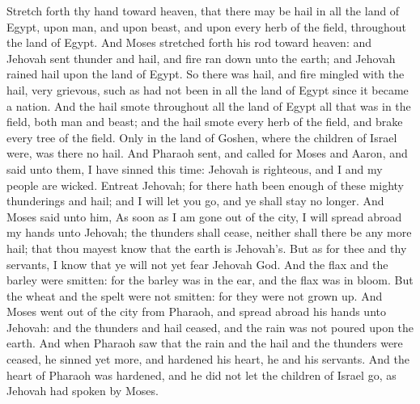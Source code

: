 Stretch forth thy hand toward heaven, that there may be hail in all the land of Egypt, upon man, and upon beast, and upon every herb of the field, throughout the land of Egypt. And Moses stretched forth his rod toward heaven: and Jehovah sent thunder and hail, and fire ran down unto the earth; and Jehovah rained hail upon the land of Egypt. So there was hail, and fire mingled with the hail, very grievous, such as had not been in all the land of Egypt since it became a nation. And the hail smote throughout all the land of Egypt all that was in the field, both man and beast; and the hail smote every herb of the field, and brake every tree of the field. Only in the land of Goshen, where the children of Israel were, was there no hail.  And Pharaoh sent, and called for Moses and Aaron, and said unto them, I have sinned this time: Jehovah is righteous, and I and my people are wicked. Entreat Jehovah; for there hath been enough of these mighty thunderings and hail; and I will let you go, and ye shall stay no longer. And Moses said unto him, As soon as I am gone out of the city, I will spread abroad my hands unto Jehovah; the thunders shall cease, neither shall there be any more hail; that thou mayest know that the earth is Jehovah’s. But as for thee and thy servants, I know that ye will not yet fear Jehovah God. And the flax and the barley were smitten: for the barley was in the ear, and the flax was in bloom. But the wheat and the spelt were not smitten: for they were not grown up. And Moses went out of the city from Pharaoh, and spread abroad his hands unto Jehovah: and the thunders and hail ceased, and the rain was not poured upon the earth. And when Pharaoh saw that the rain and the hail and the thunders were ceased, he sinned yet more, and hardened his heart, he and his servants. And the heart of Pharaoh was hardened, and he did not let the children of Israel go, as Jehovah had spoken by Moses. 

